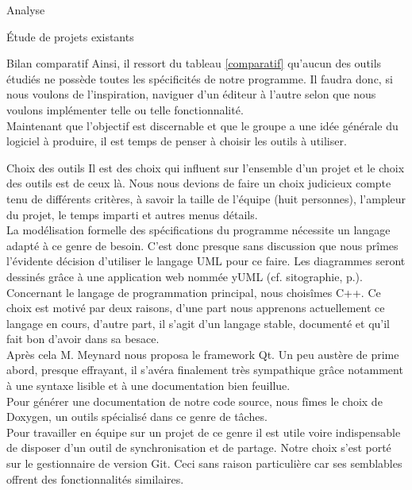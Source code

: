 \documentclass[a4paper, 12pt]{report}
\begin{document}
\begin{part}{Analyse}
\begin{chapter}{Étude de projets existants}
\begin{section}{Bilan comparatif}
				Ainsi, il ressort du tableau \ref{comparatif} qu'aucun des outils étudiés ne possède toutes les spécificités de notre programme.
				Il faudra donc, si nous voulons de l'inspiration, naviguer d'un éditeur à l'autre selon que nous voulons implémenter telle ou
				telle fonctionnalité.\\


				Maintenant que l'objectif est discernable et que le groupe a une idée générale du logiciel à produire, il est temps de
				penser à choisir les outils à utiliser.
			\end{section}
		\end{chapter}
		\begin{chapter}{Choix des outils}
			Il est des choix qui influent sur l'ensemble d'un projet et le choix des outils est de ceux là.
			Nous nous devions de faire un choix judicieux compte tenu de différents critères, à savoir la taille de l'équipe (huit personnes),
			l'ampleur du projet, le temps imparti et autres menus détails.\\


			La modélisation formelle des spécifications du programme nécessite un langage adapté à ce genre de besoin. C'est donc presque
			sans discussion que nous prîmes l'évidente décision d'utiliser le langage UML pour ce faire.
			Les diagrammes seront dessinés grâce à une application web nommée yUML (cf. sitographie, p.\pageref{sitographie}).\\


			Concernant le langage de programmation principal, nous choisîmes \gls{C++}.
			Ce choix est motivé par deux raisons, d'une part nous apprenons actuellement ce langage en cours, d'autre part,
			il s'agit d'un langage stable, documenté et qu'il fait bon d'avoir dans sa besace.\\


			Après cela M. Meynard nous proposa le framework \gls{Qt}. Un peu austère de prime abord, presque effrayant, il s'avéra finalement très
			sympathique grâce notamment à une syntaxe lisible et à une documentation bien feuillue.\\

			Pour générer une documentation de notre code source, nous fîmes le choix de \gls{Doxygen}, un outils spécialisé dans ce genre
			de tâches.\\


			Pour travailler en équipe sur un projet de ce genre il est utile voire indispensable de disposer d'un outil de synchronisation et
			de partage. Notre choix s'est porté sur le gestionnaire de version \gls{Git}. Ceci sans raison particulière car ses semblables offrent
			des fonctionnalités similaires.\\



\end{chapter}
\end{part}
\end{document}
